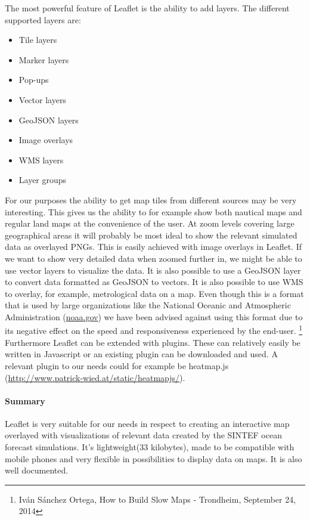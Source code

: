 \documentclass[11pt,a4paper,titlepage,oneside]{report}
\begin{document}
    The most powerful feature of Leaflet is the ability to add layers. The different supported layers are:

    \begin{itemize}
      \item Tile layers
      \item Marker layers
      \item Pop-ups
      \item Vector layers
      \item GeoJSON layers
      \item Image overlays
      \item \gls{WMS} layers
      \item Layer groups
    \end{itemize}

    For our purposes the ability to get map tiles from different sources may be very interesting. This gives us the ability to for example show both nautical maps and regular land maps at the convenience of the user. At zoom levels covering large geographical areas it will probably be most ideal to show the relevant simulated data as overlayed PNGs. This is easily achieved with image overlays in Leaflet. If we want to show very detailed data when zoomed further in, we might be able to use vector layers to visualize the data. It is also possible to use a GeoJSON layer to convert data formatted as GeoJSON to vectors.
    It is also possible to use \gls{WMS} to overlay, for example, metrological data on a map. Even though this is a format that is used by large organizations like the National Oceanic and Atmospheric Administration (\url{noaa.gov}) we have been advised against using this format due to its negative effect on the speed and responsiveness experienced by the end-user. \footnote{Iván Sánchez Ortega, How to Build Slow Maps - Trondheim, September 24, 2014}
    Furthermore Leaflet can be extended with plugins. These can relatively easily be written in Javascript or an existing plugin can be downloaded and used. A relevant plugin to our needs could for example be heatmap.js (\url{http://www.patrick-wied.at/static/heatmapjs/}).

    \paragraph{Summary}
    Leaflet is very suitable for our needs in respect to creating an interactive map overlayed with visualizations of relevant data created by the SINTEF ocean forecast simulations. It's lightweight(33 kilobytes), made to be compatible with mobile phones and very flexible in possibilities to display data on maps. It is also well documented.
\end{document}
